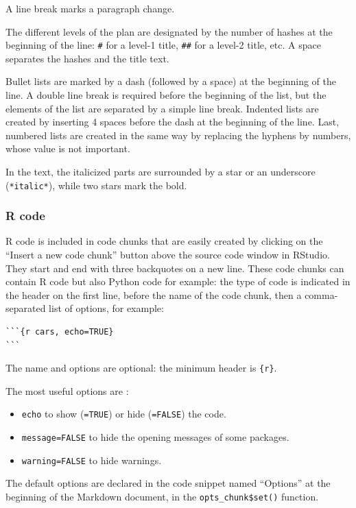 \documentclass[
  12pt,
  american,
  a4paper,
  extrafontsizes,onecolumn,openright
  ]{memoir}
\providecommand{\tightlist}{%
  \setlength{\itemsep}{0pt}\setlength{\parskip}{0pt}}
\begin{document}
A line break marks a paragraph change.

The different levels of the plan are designated by the number of hashes at the beginning of the line: \texttt{\#} for a level-1 title, \texttt{\#\#} for a level-2 title, etc.
A space separates the hashes and the title text.

Bullet lists are marked by a dash (followed by a space) at the beginning of the line.
A double line break is required before the beginning of the list, but the elements of the list are separated by a simple line break.
Indented lists are created by inserting 4 spaces before the dash at the beginning of the line.
Last, numbered lists are created in the same way by replacing the hyphens by numbers, whose value is not important.

In the text, the italicized parts are surrounded by a star or an underscore (\texttt{*italic*}), while two stars mark the bold.

\hypertarget{r-code}{%
\subsubsection{R code}\label{r-code}}

R code is included in code chunks that are easily created by clicking on the \enquote{Insert a new code chunk} button above the source code window in RStudio.
They start and end with three backquotes on a new line.
These code chunks can contain R code but also Python code for example: the type of code is indicated in the header on the first line, before the name of the code chunk, then a comma-separated list of options, for example:

\begin{verbatim}
```{r cars, echo=TRUE}
```
\end{verbatim}

The name and options are optional: the minimum header is \texttt{\{r\}}.

The most useful options are :

\begin{itemize}
\tightlist
\item
  \texttt{echo} to show (\texttt{=TRUE}) or hide (\texttt{=FALSE}) the code.
\item
  \texttt{message=FALSE} to hide the opening messages of some packages.
\item
  \texttt{warning=FALSE} to hide warnings.
\end{itemize}

The default options are declared in the code snippet named \enquote{Options} at the beginning of the Markdown document, in the \texttt{opts\_chunk\$set()} function.
\end{document}
